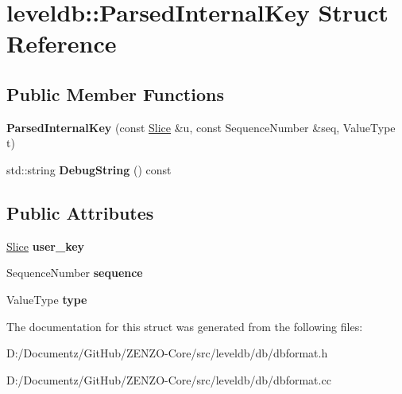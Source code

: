 \hypertarget{structleveldb_1_1_parsed_internal_key}{}\section{leveldb\+::Parsed\+Internal\+Key Struct Reference}
\label{structleveldb_1_1_parsed_internal_key}
\subsection*{Public Member Functions}
\begin{DoxyCompactItemize}
\item 
\mbox{\label{structleveldb_1_1_parsed_internal_key_acc24f6ddeb4223d0484613076a48a9a1}} 
{\bfseries Parsed\+Internal\+Key} (const \mbox{\hyperlink{classleveldb_1_1_slice}{Slice}} \&u, const Sequence\+Number \&seq, Value\+Type t)
\item 
\mbox{\label{structleveldb_1_1_parsed_internal_key_a5371a83d503751e8ea7cc23fa16c8bfd}} 
std\+::string {\bfseries Debug\+String} () const
\end{DoxyCompactItemize}
\subsection*{Public Attributes}
\begin{DoxyCompactItemize}
\item 
\mbox{\label{structleveldb_1_1_parsed_internal_key_aa6e30fcf3c95fc1485d60fa08efe2b9d}} 
\mbox{\hyperlink{classleveldb_1_1_slice}{Slice}} {\bfseries user\+\_\+key}
\item 
\mbox{\label{structleveldb_1_1_parsed_internal_key_a3ab7f4382bc026081875fde4dea95e61}} 
Sequence\+Number {\bfseries sequence}
\item 
\mbox{\label{structleveldb_1_1_parsed_internal_key_ac7c10a6f60f93982b886ad1fbbafd6c2}} 
Value\+Type {\bfseries type}
\end{DoxyCompactItemize}


The documentation for this struct was generated from the following files\+:\begin{DoxyCompactItemize}
\item 
D\+:/\+Documentz/\+Git\+Hub/\+Z\+E\+N\+Z\+O-\/\+Core/src/leveldb/db/dbformat.\+h\item 
D\+:/\+Documentz/\+Git\+Hub/\+Z\+E\+N\+Z\+O-\/\+Core/src/leveldb/db/dbformat.\+cc\end{DoxyCompactItemize}

